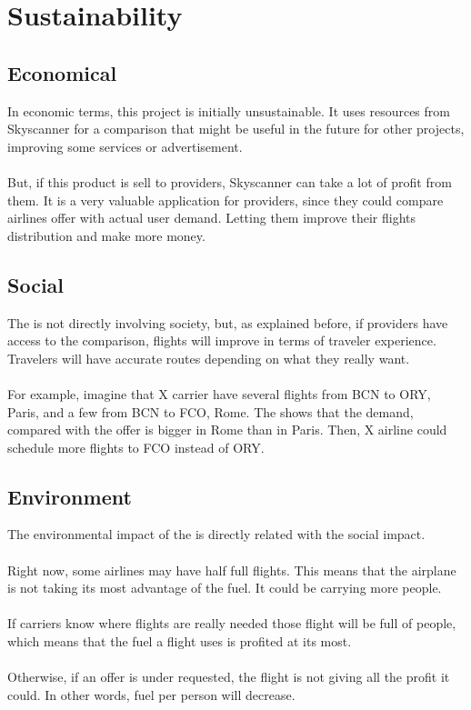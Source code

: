 \section{Sustainability}

\subsection{Economical}

In economic terms, this project is initially unsustainable. It uses resources from Skyscanner for a comparison that might be useful in the future for other projects, improving some services or advertisement.
\\\\
But, if this product is sell to providers, Skyscanner can take a lot of profit from them. It is a very valuable application for providers, since they could compare airlines offer with actual user demand. Letting them improve their flights distribution and make more money.

\subsection{Social}

The \thesistitle is not directly involving society, but, as explained before, if providers have access to the comparison, flights will improve in terms of traveler experience. Travelers will have accurate routes depending on what they really want.
\\\\
For example, imagine that X carrier have several flights from BCN to ORY, Paris, and a few from BCN to FCO, Rome. The \thesistitle shows that the demand, compared with the offer is bigger in Rome than in Paris. Then, X airline could schedule more flights to FCO instead of ORY.

\subsection{Environment}

The environmental impact of the \thesistitle is directly related with the social impact.
\\\\
Right now, some airlines may have half full flights. This means that the airplane is not taking its most advantage of the fuel. It could be carrying more people.
\\\\
If carriers know where flights are really needed those flight will be full of people, which means that the fuel a flight uses is profited at its most.
\\\\
Otherwise, if an offer is under requested, the flight is not giving all the profit it could.
In other words, fuel per person will decrease.


